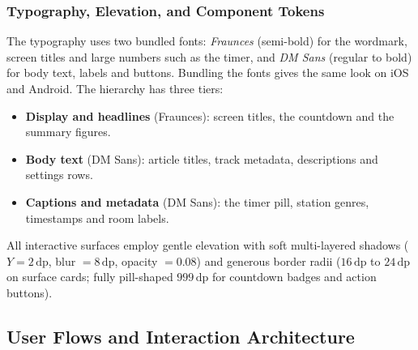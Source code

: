 \subsubsection{Typography, Elevation, and Component Tokens}
The typography uses two bundled fonts: \textit{Fraunces} (semi-bold) for the wordmark, screen titles and large numbers such as the timer, and \textit{DM Sans} (regular to bold) for body text, labels and buttons. Bundling the fonts gives the same look on iOS and Android. The hierarchy has three tiers:
\begin{itemize}[leftmargin=1.5em, itemsep=2pt]
  \item \textbf{Display and headlines} (Fraunces): screen titles, the countdown and the summary figures.
  \item \textbf{Body text} (DM Sans): article titles, track metadata, descriptions and settings rows.
  \item \textbf{Captions and metadata} (DM Sans): the timer pill, station genres, timestamps and room labels.
\end{itemize}
All interactive surfaces employ gentle elevation with soft multi-layered shadows ($Y=2\,\text{dp}$, blur $=8\,\text{dp}$, opacity $=0.08$) and generous border radii ($16\,\text{dp}$ to $24\,\text{dp}$ on surface cards; fully pill-shaped $999\,\text{dp}$ for countdown badges and action buttons).

\subsection{User Flows and Interaction Architecture}
\label{sec:user-flows}

